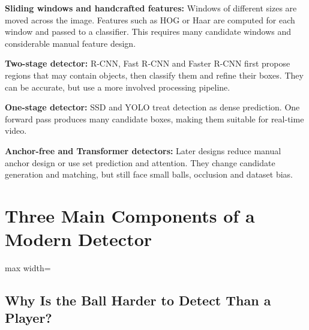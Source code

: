 \documentclass[11pt,a4paper,oneside]{report}
\begin{document}
\begin{historyBox}
\textbf{Sliding windows and handcrafted features:}\quad
Windows of different sizes are moved across the image. Features such as HOG or Haar are computed for each window and passed to a classifier. This requires many candidate windows and considerable manual feature design.

\textbf{Two-stage detector:}\quad
R-CNN, Fast R-CNN and Faster R-CNN first propose regions that may contain objects, then classify them and refine their boxes. They can be accurate, but use a more involved processing pipeline.

\textbf{One-stage detector:}\quad
SSD and YOLO treat detection as dense prediction. One forward pass produces many candidate boxes, making them suitable for real-time video.

\textbf{Anchor-free and Transformer detectors:}\quad
Later designs reduce manual anchor design or use set prediction and attention. They change candidate generation and matching, but still face small balls, occlusion and dataset bias.
\end{historyBox}

\section{Three Main Components of a Modern Detector}

\begin{center}
\begin{adjustbox}{max width=\linewidth}
\end{adjustbox}
\end{center}

\subsection{Why Is the Ball Harder to Detect Than a Player?}
\end{document}
